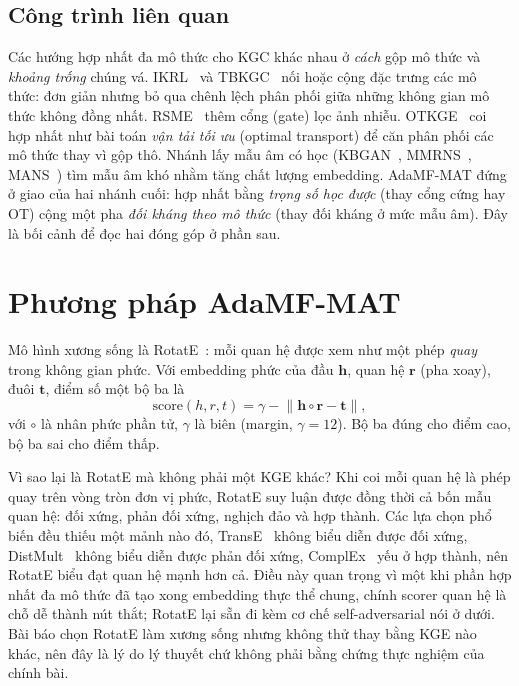 \documentclass[conference]{IEEEtran}
\newcommand{\hlg}[1]{{\sethlcolor{hlgreen}\hl{#1}}}
\renewcommand{\hl}[1]{#1}
\begin{document}
\subsection{Công trình liên quan}
Các hướng hợp nhất đa mô thức cho KGC khác nhau ở \emph{cách} gộp mô thức và \emph{khoảng
trống} chúng vá. IKRL~\cite{ikrl} và TBKGC~\cite{tbkgc} nối hoặc cộng đặc trưng các mô thức: đơn giản
nhưng bỏ qua chênh lệch phân phối giữa những không gian mô thức không đồng nhất. RSME~\cite{rsme} thêm
cổng (gate) lọc ảnh nhiễu. OTKGE~\cite{otkge} coi hợp nhất như bài toán \emph{vận tải tối ưu}
(optimal transport) để căn phân phối các mô thức thay vì gộp thô. Nhánh lấy mẫu âm có học
(KBGAN~\cite{kbgan}, MMRNS~\cite{mmrns}, MANS~\cite{mans}) tìm mẫu âm khó nhằm tăng chất lượng
embedding. AdaMF-MAT đứng ở giao của hai nhánh cuối: hợp nhất bằng
\emph{trọng số học được} (thay cổng cứng hay OT) cộng một pha \emph{đối kháng theo mô thức}
(thay đối kháng ở mức \hlg{mẫu âm}). Đây là bối cảnh để đọc hai đóng góp ở phần sau.

\section{Phương pháp AdaMF-MAT}
\label{sec:adamf-method}

Mô hình xương sống là RotatE~\cite{rotate}: mỗi quan hệ được xem như một phép
\emph{quay} trong không gian phức. Với embedding phức của đầu $\mathbf{h}$, quan
hệ $\mathbf{r}$ (pha xoay), đuôi $\mathbf{t}$, điểm số một bộ ba là
\begin{equation}
  \mathrm{score}(h,r,t) = \gamma - \lVert \mathbf{h} \circ \mathbf{r} - \mathbf{t} \rVert,
\end{equation}
với $\circ$ là nhân phức phần tử, $\gamma$ là biên (margin, $\gamma=12$). Bộ ba
đúng cho điểm cao, bộ ba sai cho điểm thấp.

Vì sao lại là RotatE mà không phải một KGE khác? Khi coi mỗi quan hệ là phép quay
trên vòng tròn đơn vị phức, RotatE suy luận được đồng thời cả bốn mẫu quan hệ: đối
xứng, phản đối xứng, nghịch đảo và hợp thành. Các lựa chọn phổ biến đều thiếu một
mảnh nào đó, TransE~\cite{transe} không biểu diễn được đối xứng, DistMult~\cite{distmult} không
biểu diễn được phản đối xứng, ComplEx~\cite{complex} yếu ở hợp thành, nên RotatE biểu đạt quan hệ mạnh hơn cả.
Điều này quan trọng vì một khi phần hợp nhất đa mô thức đã tạo xong embedding thực
thể chung, chính scorer quan hệ là chỗ dễ thành nút thắt; RotatE lại sẵn đi kèm cơ
chế self-adversarial nói ở dưới. \hl{Bài báo} chọn RotatE
làm xương sống nhưng không thử thay bằng KGE nào khác, nên đây là lý do lý thuyết chứ
không phải bằng chứng thực nghiệm của chính bài.
\end{document}
